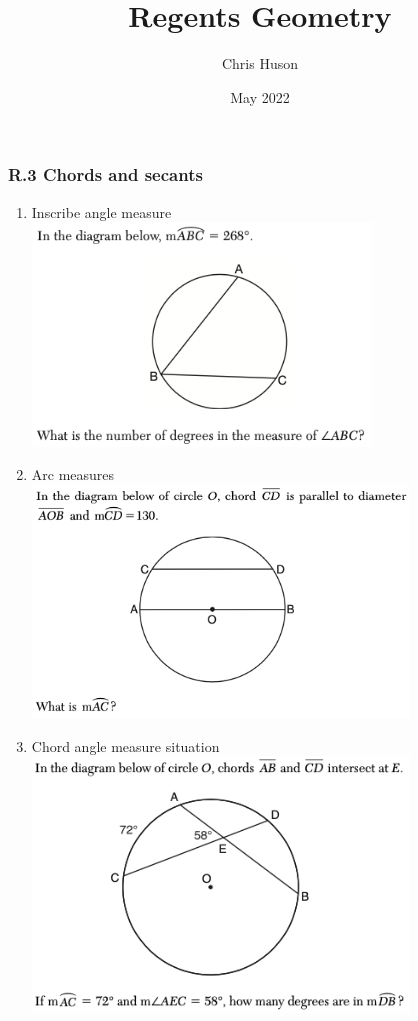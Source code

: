 \documentclass[12pt, oneside]{article}
\title{Regents Geometry}
\author{Chris Huson}
\date{May 2022}
\begin{document}
\subsubsection*{R.3 Chords and secants}
\begin{enumerate}
\item Inscribe angle measure\\
\includegraphics[width=9cm]{R-2images/R-2chordsA.png}

\item Arc measures\\
\includegraphics[width=10cm]{R-2images/R-2chordsB.png}

\item Chord angle measure situation\\
\includegraphics[width=10cm]{R-2images/R-2chordsH.png}


\end{enumerate}
\end{document}
